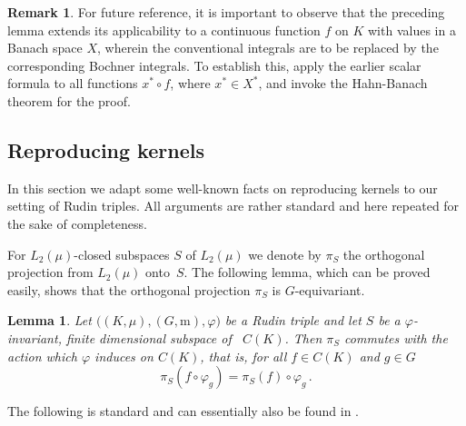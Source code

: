 \documentclass[12pt]{amsart}
\numberwithin{subsection}{section}
\newtheorem{lemma}[theorem]{Lemma}
\theoremstyle{definition}
\newtheorem{remark}[theorem]{Remark}
\theoremstyle{remark}
\begin{document}
\smallskip


\begin{remark} \label{schlau}
 For future reference, it is important to observe that the preceding lemma extends its applicability to a continuous function $f$ on $K$ with values in a Banach space $X$, wherein the conventional integrals are to be replaced by the corresponding Bochner integrals. To establish this, apply the earlier scalar formula to all functions $x^\ast \circ f$, where $x^\ast \in X^\ast$, and invoke the Hahn-Banach theorem for the proof.
\end{remark}







\subsection{Reproducing kernels} \label{inva}

In this section we adapt some well-known facts 
on reproducing kernels to our setting of Rudin triples.
All arguments are rather standard and here repeated for the sake of completeness.


For $L_2(\mu)$-closed subspaces $S$ of $L_2(\mu)$ we denote by $\pi_S$  the orthogonal
projection from $L_2(\mu)$ onto~$S$.
The following lemma, which can be proved easily, shows that the orthogonal projection $\pi_S$  is $G$-equivariant. 

\begin{lemma}\label{lemma: pi_S commutes with L_V}
Let $\big((K,\mu),(G,\mathrm{m}),\varphi\big)$ be a Rudin triple and let $S$ be a 
$\varphi$-invariant, finite dimensional subspace
of \, $C(K)$. Then $\pi_S$ commutes with the action which
$\varphi$ induces on $C(K)$, that is, 
for all $f \in C(K)$ and $g \in G$
\begin{equation*}
    \pi_S(f\circ \varphi_g) = \pi_S(f)\circ \varphi_g\,.
\end{equation*}
\end{lemma}



The following is standard and can essentially also be found in \cite[Lemma 2.4. and Remark 2.5.]{defant2024minimal}.

\qedhere
\end{document}
